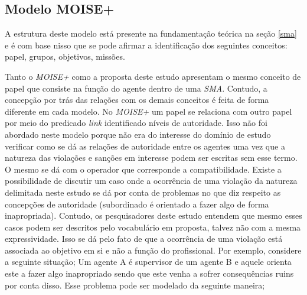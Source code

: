 \subsection{Modelo MOISE+   }

A estrutura deste modelo está presente na fundamentação teórica na seção \ref{sma} e é com base nisso que se pode afirmar a identificação dos seguintes 
conceitos: papel, grupos, objetivos, missões. 

Tanto o \textit{MOISE+} como a proposta deste estudo apresentam o mesmo conceito de papel que consiste na função do agente dentro de uma \textit{SMA}. 
Contudo, a concepção por trás das relações com os demais conceitos é feita de forma diferente em cada modelo. No \textit{MOISE+} um papel se relaciona
com outro papel por meio do predicado \textit{link} identificado níveis de autoridade. Isso não foi abordado neste modelo porque não era do interesse 
do domínio de estudo verificar como se dá as relações de autoridade entre os agentes uma vez que a natureza das violações e sanções em interesse podem 
ser escritas sem esse termo. O mesmo se dá com o operador que corresponde a compatibilidade. Existe a possibilidade de discutir um caso onde a ocorrência 
de uma violação da natureza delimitada neste estudo se dá por conta de problemas no que diz respeito as concepções de autoridade (subordinado é orientado 
a fazer algo de forma inapropriada). Contudo, os pesquisadores deste estudo entendem que mesmo esses casos podem ser descritos pelo vocabulário em proposta,
talvez não com a mesma expressividade. Isso se dá pelo fato de que a ocorrência de uma violação está associada ao objetivo em si e não a função do 
profissional. Por exemplo, considere a seguinte situação; Um agente A é supervisor de um agente B e aquele orienta este a fazer algo inapropriado sendo que 
este venha a sofrer consequências ruins por conta disso. Esse problema pode ser modelado da seguinte maneira;

